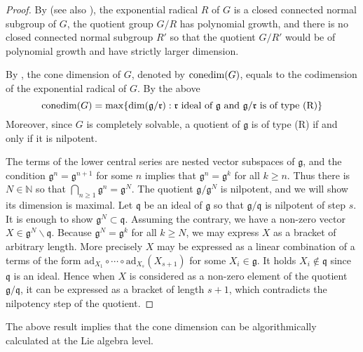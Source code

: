 \documentclass[a4paper,12pt]{amsart}
\newcommand{\ad}{\mathrm{ad}}
\newcommand{\pois}{\backslash}
\theoremstyle{plain}
\theoremstyle{definition}
\theoremstyle{plain}
\theoremstyle{remark}
\begin{document}
\begin{proof}
	By \cite{avain:osin-exp} (see also \cite[Theorem 6.1]{MR2399134}), the exponential radical  \(R\) of \( G \) is a closed connected normal subgroup of \( G \), the quotient group \( G/R \) has polynomial growth, and there is no closed connected normal subgroup \( R' \) so that the quotient \( G/R' \) would be of polynomial growth and have strictly larger dimension.
	
	By \cite[Theorem 1.1]{MR2399134}, the cone dimension of \( G \), denoted by \( \mathrm{conedim}(G) \), equals to the codimension of the exponential radical of \( G\). By the above
	\begin{equation*}
	\mathrm{conedim}(G) = \max \{\dim (\mathfrak{g}/\mathfrak{r} ) : \mathfrak{r} \text{ ideal of } \mathfrak{g} \text{ and } \mathfrak{g}/\mathfrak{r} \text{ is of type (R)} \}
	\end{equation*}
	Moreover, since \( G \) is completely solvable, a quotient of \( \mathfrak{g} \) is of type (R) if and only if it is nilpotent.
	
	The terms of the lower central series are nested vector subspaces of \( \mathfrak{g} \), and the condition \( \mathfrak{g}^n=\mathfrak{g}^{n+1} \) for some \(n\) implies that \( \mathfrak{g}^n = \mathfrak{g}^k \) for all \( k \ge n \). Thus there is \( N \in \mathbb{N} \) so that \( \bigcap_{n \ge 1} \mathfrak{g}^{n} = \mathfrak{g}^N \). The quotient \( \mathfrak{g}/\mathfrak{g}^N \) is nilpotent, and we will show its dimension is maximal.
	Let \( \mathfrak{q} \) be an ideal of \( \mathfrak{g} \) so that \( \mathfrak{g}/\mathfrak{q} \) is nilpotent of step \( s \). It is enough to show \( \mathfrak{g}^N \subset \mathfrak{q} \). Assuming the contrary, we have a non-zero vector \( X \in \mathfrak{g}^N \pois \mathfrak{q} \). Because \( \mathfrak{g}^N = \mathfrak{g}^k \) for all \( k \ge N \), we may express \( X \) as a bracket of arbitrary length. More precisely \( X \)  may be expressed as a linear combination of a terms of the form
	\( \ad_{X_1} \circ \cdots \circ  \ad_{X_s}(X_{s+1}) \) for some \( X_i \in \mathfrak{g} \). It holds \( X_i \not\in \mathfrak{q} \) since \( \mathfrak{q} \) is an ideal. Hence when \( X \) is considered as a non-zero element of the quotient \( \mathfrak{g} / \mathfrak{q} \), it can be expressed as a bracket of length \(s+1\), which contradicts the nilpotency step of the quotient.
\end{proof} 
The above result implies that the cone dimension can be algorithmically calculated at the Lie algebra level.
\end{document}
